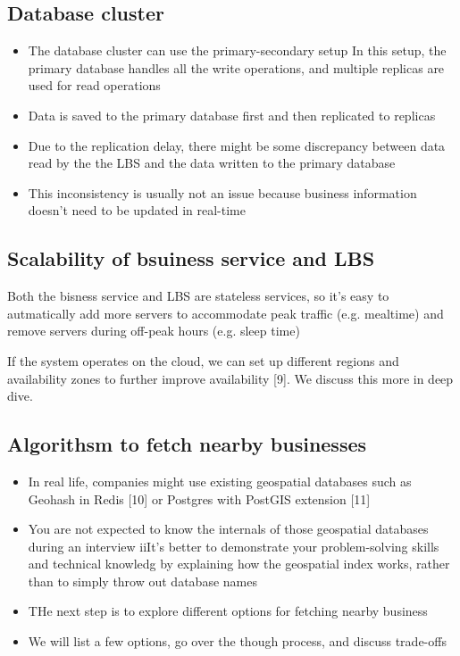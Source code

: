 \documentclass{report}
\theoremstyle{definition}
\let\oldsubsection\subsection
\renewcommand{\subsection}{\oldsubsection*}
\begin{document}
\subsection{Database cluster}

\begin{itemize}
\item
The database cluster can use the primary-secondary setup
In this setup, the primary database handles all the write operations, and multiple replicas are used for read operations
\item
Data is saved to the primary database first and then replicated to replicas
\item
Due to the replication delay, there might be some discrepancy between data read by the the LBS and the data written to the primary database
\item
This inconsistency is usually not an issue because business information doesn't need to be updated in real-time
\end{itemize}

\subsection{Scalability of bsuiness service and LBS}

Both the bisness service and LBS are stateless services, so it's easy to autmatically add more servers to accommodate peak traffic (e.g. mealtime) and remove servers during off-peak hours (e.g. sleep time)

If the system operates on the cloud, we can set up different regions and availability zones to further improve availability [9]. We discuss this more in deep dive.

\subsection{Algorithsm to fetch nearby businesses}

\begin{itemize}
\item
In real life, companies might use existing geospatial databases such as Geohash in Redis [10] or Postgres with PostGIS extension [11]
\item
You are not expected to know the internals of those geospatial databases during an interview
iiIt's better to demonstrate your problem-solving skills and technical knowledg  by explaining how the geospatial index works, rather than to simply throw out database names
\item
THe next step is to explore different options for fetching nearby business
\item
We will list a few options, go over the though process, and discuss trade-offs
\end{itemize}
\end{document}
